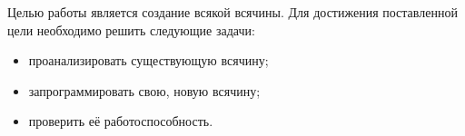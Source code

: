 \Introduction

Целью работы является создание всякой всячины. Для достижения поставленной цели необходимо решить следующие задачи:

\begin{itemize}
\item проанализировать существующую всячину;
\item запрограммировать свою, новую всячину;
\item проверить её работоспособность.
\end{itemize}
%



